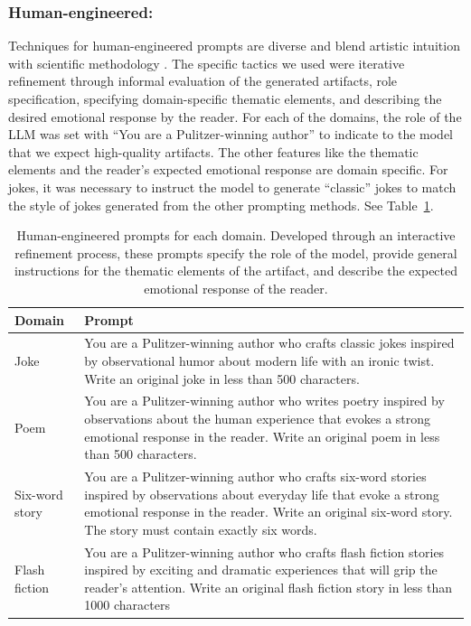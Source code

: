 \documentclass[phd,electronic,oneside,twosidetoc,letterpaper,chaptercenter,parttop,lof]{byumsphd}
\begin{document}
\subsubsection{Human-engineered: } Techniques for human-engineered prompts are diverse and blend artistic intuition with scientific methodology \cite{lazovsky2025prompt,openai_prompt_engineering}. The specific tactics we used were iterative refinement through informal evaluation of the generated artifacts, role specification, specifying domain-specific thematic elements, and describing the desired emotional response by the reader. For each of the domains, the role of the LLM was set with “You are a Pulitzer-winning author” to indicate to the model that we expect high-quality artifacts. The other features like the thematic elements and the reader's expected emotional response are domain specific. For jokes, it was necessary to instruct the model to generate “classic” jokes to match the style of jokes generated from the other prompting methods.  See Table~\ref{tab:prompts}. 


\begin{table}[t!]
\centering
\begin{tabular}{|p{}|p{}|}
\hline
\textbf{Domain} & \textbf{Prompt} \\
\hline
Joke & You are a Pulitzer-winning author who crafts classic jokes inspired by observational humor about modern life with an ironic twist. Write an original joke in less than 500 characters. \\
\hline
Poem & You are a Pulitzer-winning author who writes poetry inspired by observations about the human experience that evokes a strong emotional response in the reader. Write an original poem in less than 500 characters. \\
\hline
Six-word story & You are a Pulitzer-winning author who crafts six-word stories inspired by observations about everyday life that evoke a strong emotional response in the reader. Write an original six-word story. The story must contain exactly six words. \\
\hline
Flash fiction & You are a Pulitzer-winning author who crafts flash fiction stories inspired by exciting and dramatic experiences that will grip the reader's attention. Write an original flash fiction story in less than 1000 characters \\
\hline
\end{tabular}
\caption{Human-engineered prompts for each domain. Developed through an interactive refinement process, these prompts specify the role of the model, provide general instructions for the thematic elements of the artifact, and describe the expected emotional response of the reader.}
\label{tab:prompts}\vspace{-.1in}
\end{table}
\end{document}
